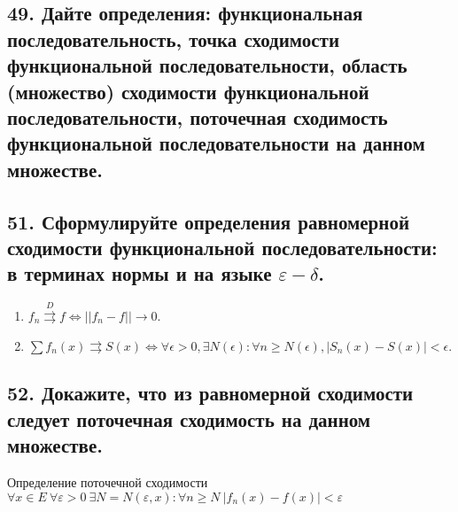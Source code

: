 \documentclass[a4paper, fleqn]{article}
\begin{document}
        
    \subsection*{49. Дайте определения: функциональная последовательность, точка сходимости функциональной последовательности, область (множество) сходимости функциональной последовательности, поточечная сходимость функциональной последовательности на данном множестве.}
   
        
    \subsection*{51. Сформулируйте определения равномерной сходимости функциональной последовательности: в терминах нормы и на языке $\varepsilon - \delta$.}
    \begin{enumerate}
        \item $f_n \overset{D}{\rightrightarrows} f \iff ||f_n - f|| \rightarrow 0$. \\
      \item $\sum f_n(x) \rightrightarrows S(x) \iff \forall \epsilon > 0, \exists N(\epsilon): \forall n \geqslant N(\epsilon), |S_n(x) - S(x)| < \epsilon$. \\
    \end{enumerate}
        
        
        \subsection*{52. Докажите, что из равномерной сходимости следует поточечная сходимость на данном множестве.}
        Определение поточечной сходимости $\forall x \in E\ \forall \varepsilon > 0\ \exists N = N(\varepsilon, x) : \forall n \geqslant N\ |f_n(x) - f(x)| < \varepsilon$
\end{document}
